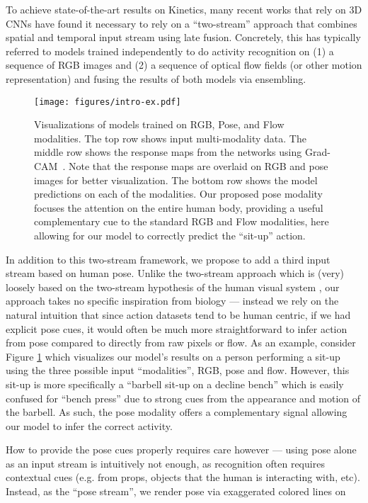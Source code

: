 \documentclass[letterpaper]{article} \usepackage{aaai21}  \usepackage{times}  \usepackage{helvet} \usepackage{courier}  \usepackage[hyphens]{url}  \usepackage{graphicx} \urlstyle{rm} \def\UrlFont{\rm}  \usepackage{natbib}  \usepackage{caption} \frenchspacing  \setlength{\pdfpagewidth}{8.5in}  \setlength{\pdfpageheight}{11in}
\begin{document}
To achieve state-of-the-art results on Kinetics, many recent works that rely on 3D CNNs \cite{taylor2010convolutional,tran2015learning} have found it necessary to rely on a “two-stream” approach \cite{Simonyan2} that combines spatial and temporal input stream using late fusion.  Concretely, this has typically referred to models trained independently to do activity recognition on (1) a sequence of RGB images and (2) a sequence of optical flow fields (or other motion representation) and fusing the results of both models via ensembling.


\begin{figure}
\centering
\texttt{[image: figures/intro-ex.pdf]}
\caption{\footnotesize Visualizations of models trained on RGB, Pose, and Flow modalities. The top row shows input multi-modality data. The middle row shows the response maps from the networks using Grad-CAM~\cite{selvaraju2017grad}. Note that the response maps are overlaid on RGB and pose images for better visualization. The bottom row shows the model predictions on each of the modalities. Our proposed pose modality focuses the attention on the entire human body, providing a useful complementary cue to the standard RGB and Flow modalities, here allowing for our model to correctly predict the ``sit-up'' action.}
\label{fig:pose-intro}
\vspace{-0.5cm}
\end{figure}

In addition to this two-stream framework, we propose to add a third input stream based on human pose.  Unlike the two-stream approach which is (very) loosely based on the two-stream hypothesis of the human visual system \cite{goodale1992separate}, our approach takes no specific inspiration from biology --- instead we rely on the natural intuition that since action datasets tend to be human centric, if we had explicit pose cues, it would often be much more straightforward to infer action from pose compared to directly from raw pixels or flow.  As an example, consider Figure \ref{fig:pose-intro} which visualizes our model’s results on a person performing a sit-up using the three possible input “modalities”, RGB, pose and flow.  However, this sit-up is more specifically a “barbell sit-up on a decline bench” which is easily confused for “bench press” due to strong cues from the appearance and motion of the barbell. As such, the pose modality offers a complementary signal allowing our model to infer the correct activity.

How to provide the pose cues properly requires care however --- using pose alone as an input stream is intuitively not enough, as recognition often requires contextual cues (e.g. from props, objects that the human is interacting with, etc).  Instead, as the “pose stream”, we render pose via exaggerated colored lines on top of each corresponding RGB frame, which allows us to benefit from both a clear pose based signal as well as contextual cues from surrounding appearance.  We demonstrate via ablations that this choice to superimpose pose with the corresponding RGB frame is critical for good results.
\end{document}
